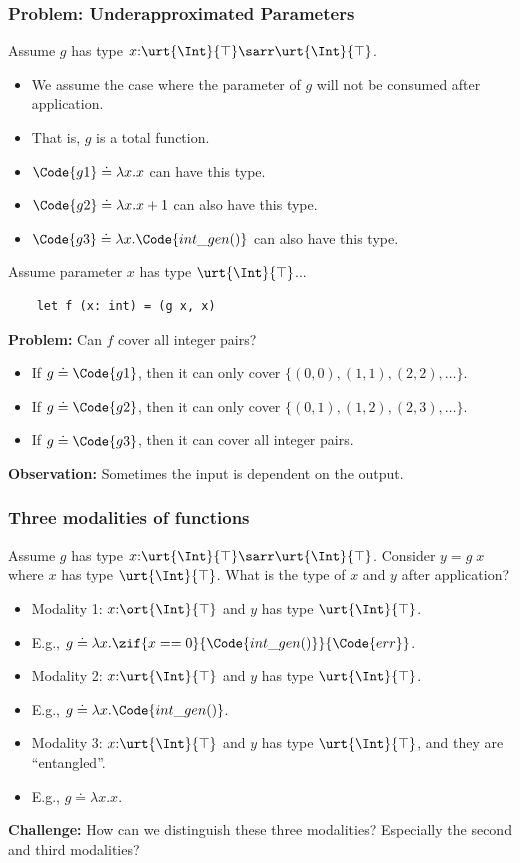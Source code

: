 \begin{frame}[fragile]
    \frametitle{Problem: Underapproximated Parameters}
Assume $g$ has type $x{:}\urt{\Int}{\top}\sarr\urt{\Int}{\top}$.
\begin{itemize}
    \item We assume the case where the parameter of $g$ will not be consumed after application.
    \item That is, $g$ is a total function.
    \item $\Code{g1} \doteq \lambda x. x$ can have this type.
    \item $\Code{g2} \doteq \lambda x. x+1$ can also have this type.
    \item $\Code{g3} \doteq \lambda x. \Code{int\_gen()}$ can also have this type.
\end{itemize}

Assume parameter $x$ has type $\urt{\Int}{\top}$...
\begin{verbatim}
    let f (x: int) = (g x, x)
\end{verbatim}
\textbf{Problem:} Can $f$ cover all integer pairs?
\begin{itemize}
    \item If $g \doteq \Code{g1}$, then it can only cover $\{(0,0), (1,1), (2,2), \ldots\}$.
    \item If $g \doteq \Code{g2}$, then it can only cover $\{(0,1), (1,2), (2,3), \ldots\}$.
    \item If $g \doteq \Code{g3}$, then it can cover all integer pairs.
\end{itemize}

\textbf{Observation:} Sometimes the input is dependent on the output.

\end{frame}

\begin{frame}[fragile]
    \frametitle{Three modalities of functions}
Assume $g$ has type $x{:}\urt{\Int}{\top}\sarr\urt{\Int}{\top}$. Consider $y = g\;x$ where $x$ has type $\urt{\Int}{\top}$. What is the type of $x$ and $y$ after application?
\begin{itemize}
    \item Modality 1: $x{:}\ort{\Int}{\top}$ and $y$ has type $\urt{\Int}{\top}$.
    \item E.g., $g\doteq \lambda x. \zif{x == 0}{\Code{int\_gen()}}{\Code{err}}$.
    \item Modality 2: $x{:}\urt{\Int}{\top}$ and $y$ has type $\urt{\Int}{\top}$.
    \item E.g., $g\doteq \lambda x.\Code{int\_gen()}$.
    \item Modality 3: $x{:}\urt{\Int}{\top}$ and $y$ has type $\urt{\Int}{\top}$, and they are ``entangled''. 
    \item E.g., $g\doteq \lambda x.x$.
\end{itemize}

\textbf{Challenge:} How can we distinguish these three modalities? Especially the second and third modalities?

\end{frame}

